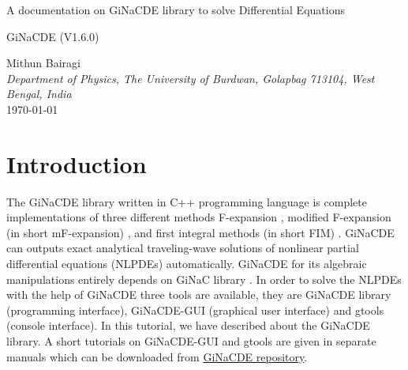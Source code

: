 \documentclass[prd,aps,floats,showkeys,nofootinbib,notitlepage]{revtex4-2}
\begin{document}
	\begin{titlepage}
		\begin{center}
			\Huge {A documentation on GiNaCDE library to solve Differential Equations} 
		\end{center}
		\vspace{3cm}
		\begin{center}
			\Large{GiNaCDE (V1.6.0)}
		\end{center}
		\vspace{2cm} 
		\begin{center} 
			Mithun Bairagi \\[3pt]  
			\textit{Department of Physics, The University of Burdwan, Golapbag 713104, West Bengal, India} \\ [1cm]
			\today
		\end{center}
	\end{titlepage}
	
	\clearpage
	
	\tableofcontents
	
	\section{Introduction}
	The GiNaCDE library written in C++ programming language is complete implementations of three different methods F-expansion \cite{fexpn024,fexpn024_1,fexpn123,0246,234}, modified F-expansion (in short mF-expansion) \cite{modfexpn}, and first integral methods (in short FIM) \cite{fim0,fim,mirza,complexTwt1}. GiNaCDE can outputs exact analytical traveling-wave solutions of nonlinear partial differential equations (NLPDEs) automatically.
	GiNaCDE for its algebraic manipulations entirely depends on GiNaC library \cite{ginac}.  
	In order to solve the NLPDEs with the help of GiNaCDE three tools are available, they are GiNaCDE library (programming interface), GiNaCDE-GUI (graphical user interface) and gtools (console interface). In this tutorial, we have described about the GiNaCDE library. A short tutorials on GiNaCDE-GUI and gtools are given in separate manuals which can be downloaded from \href{https://github.com/mithun218/GiNaCDE}{GiNaCDE repository}.
\end{document}
